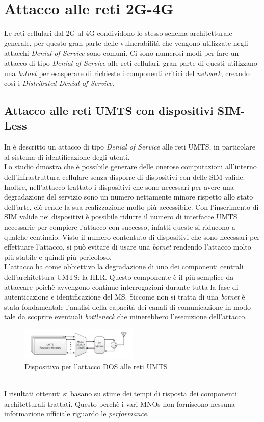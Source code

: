 \section{Attacco alle reti 2G-4G}
Le reti cellulari dal 2G al 4G condividono lo stesso schema architetturale generale, per questo gran parte delle vulnerabilità che vengono
utilizzate negli attacchi \textit{Denial of Service} sono comuni.
Ci sono numerosi modi per fare un attacco di tipo \textit{Denial of Service} alle reti cellulari, gran parte di questi utilizzano
una \textit{botnet} per esasperare di richieste i componenti critici del \textit{network}, creando così i \textit{Distributed Denial of Service}.\\

\subsection{Attacco alle reti UMTS con dispositivi SIM-Less}
In \cite{umts-dos} è descritto un attacco di tipo \textit{Denial of Service} alle reti UMTS, in particolare al
sistema di identificazione degli utenti. \\
Lo studio dmostra che è possibile generare delle onerose computazioni all'interno dell'infrastruttura cellulare senza 
disporre di dispositivi con delle SIM valide. Inoltre, nell'attacco trattato i dispositivi che sono necessari per avere una 
degradazione del servizio sono un numero nettamente minore rispetto allo stato dell'arte, ciò rende la sua realizzazione molto
più accessibile. Con l'inserimento di SIM valide nei dispositivi è possibile ridurre il numero di interfacce UMTS necessarie per compiere 
l'attacco con successo, infatti queste si riducono a qualche centinaio.
Visto il numero contentuto di dispositivi che sono necessari per effettuare l'attacco, si può evitare di usare una \textit{botnet} rendendo l'attacco
molto più stabile e quindi più pericoloso.\\
L'attacco ha come obbiettivo la degradazione di uno dei componenti centrali dell'architettura UMTS: la HLR. Questo componente è il più semplice da 
attaccare poichè avvengono continue interrogazioni durante tutta la fase di autenticazione e identificazione del MS.
Siccome non si tratta di una \textit{botnet} è stata fondamentale l'analisi della capacità dei canali di comunicazione in modo tale da scoprire eventuali
\textit{bottleneck} che minerebbero l'esecuzione dell'attacco.
\begin{figure}[h]
    \centering
    \includegraphics[width=0.5\textwidth]{images/umts-dos-device.png}
    \caption{Dispositivo per l'attacco DOS alle reti UMTS\cite{umts-dos}}
\end{figure}\\
I risultati ottenuti si basano su stime dei tempi di risposta dei componenti architetturali trattati. Questo perchè i vari MNOs non forniscono nessuna 
informazione ufficiale riguardo le \textit{performance}.
